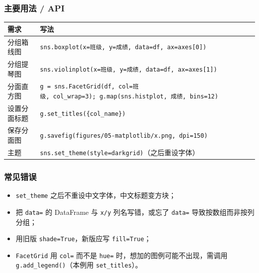 \subsubsection{主要用法 / API}\label{ux4e3bux8981ux7528ux6cd5-api-23}

{\def\LTcaptype{none} %
\begin{longtable}[]{@{}
  >{\raggedright\arraybackslash}p{}
  >{\raggedright\arraybackslash}p{}@{}}
\toprule\noalign{}
\begin{minipage}[b]{\linewidth}\raggedright
需求
\end{minipage} & \begin{minipage}[b]{\linewidth}\raggedright
写法
\end{minipage} \\
\midrule\noalign{}
\endhead
\bottomrule\noalign{}
\endlastfoot
分组箱线图 &
\texttt{sns.boxplot(x=\textquotesingle{}班级\textquotesingle{},\ y=\textquotesingle{}成绩\textquotesingle{},\ data=df,\ ax=axes{[}0{]})} \\
分组提琴图 &
\texttt{sns.violinplot(x=\textquotesingle{}班级\textquotesingle{},\ y=\textquotesingle{}成绩\textquotesingle{},\ data=df,\ ax=axes{[}1{]})} \\
分面直方图 &
\texttt{g\ =\ sns.FacetGrid(df,\ col=\textquotesingle{}班级\textquotesingle{},\ col\_wrap=3);\ g.map(sns.histplot,\ \textquotesingle{}成绩\textquotesingle{},\ bins=12)} \\
设置分面标题 &
\texttt{g.set\_titles(\textquotesingle{}\{col\_name\}\textquotesingle{})} \\
保存分面图 &
\texttt{g.savefig(\textquotesingle{}figures/05-matplotlib/x.png\textquotesingle{},\ dpi=150)} \\
主题 &
\texttt{sns.set\_theme(style=\textquotesingle{}darkgrid\textquotesingle{})}（之后重设字体） \\
\end{longtable}
}

\subsubsection{常见错误}\label{ux5e38ux89c1ux9519ux8bef-23}

\begin{itemize}
\tightlist
\item
  \texttt{set\_theme} 之后不重设中文字体，中文标题变方块；
\item
  把 \texttt{data=} 的 DataFrame 与 \texttt{x/y} 列名写错，或忘了
  \texttt{data=} 导致按数组而非按列分组；
\item
  用旧版 \texttt{shade=True}，新版应写 \texttt{fill=True}；
\item
  \texttt{FacetGrid} 用 \texttt{col=} 而不是 \texttt{hue=}
  时，想加的图例可能不出现，需调用 \texttt{g.add\_legend()}（本例用
  \texttt{set\_titles}）。
\end{itemize}

